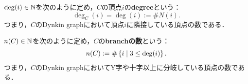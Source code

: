 \begin{definition}
  \label{def:degree}
  \leanok
  $\deg(i) \in \mathbb{N}$を次のように定め，$C$の頂点$i$の\textbf{degree}という：
  \begin{equation}
    \deg_C(i) = \deg(i) := \# N(i).
  \end{equation}
  つまり，$C$のDynkin graphにおいて頂点$i$に隣接している頂点の数である．
\end{definition}

\begin{definition}
  \label{def:numOfBranch}
  \leanok
  $n(C) \in \mathbb{N}$を次のように定め，$C$の\textbf{branchの数}という：
  \begin{equation}
    n(C) := \# \left\lbrace i \mathrel{} \middle| \mathrel{} 3 \le \deg(i) \right\rbrace.
  \end{equation}
  つまり，$C$のDynkin graphにおいてY字や十字以上に分岐している頂点の数である．
\end{definition}